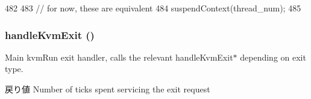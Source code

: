 \begin{DoxyCode}
482 {
483     // for now, these are equivalent
484     suspendContext(thread_num);
485 }
\end{DoxyCode}
\hypertarget{classBaseKvmCPU_ab7dc26d4e02dbccc343942dd7a3ed7d8}{
\subsubsection[{handleKvmExit}]{ handleKvmExit ()}}
\label{classBaseKvmCPU_ab7dc26d4e02dbccc343942dd7a3ed7d8}
Main kvmRun exit handler, calls the relevant handleKvmExit$\ast$ depending on exit type.

\begin{DoxyReturn}{戻り値}
Number of ticks spent servicing the exit request 
\end{DoxyReturn}



